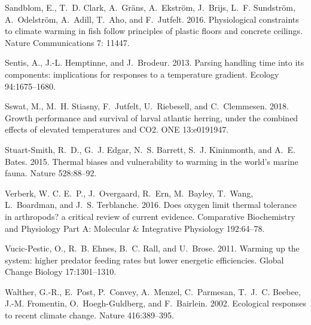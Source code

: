 \documentclass[11pt]{article}\usepackage[]{graphicx}\usepackage[]{color,soul}
\begin{document}
\begin{thebibliography}{55}
Sandblom, E., T.~D. Clark, A.~Gräns,  A.~Ekström, J.~Brijs, L.~F. Sundström, A.~Odelström, A.~Adill, T.~Aho, and F.~Jutfelt. 2016.
\newblock Physiological constraints to climate warming in fish follow principles of plastic floors and concrete ceilings. 
\newblock Nature Communications 7: 11447.


Sentis, A., J.-L. Hemptinne, and J.~Brodeur. 2013.
\newblock Parsing handling time into its components: implications for responses
  to a temperature gradient.
\newblock Ecology 94:1675--1680.

Sswat, M., M.~H. Stiasny, F.~Jutfelt, U.~Riebesell, and C.~Clemmesen.
  2018.
\newblock Growth performance and survival of larval atlantic herring, under the
  combined effects of elevated temperatures and {CO}2.
 {ONE} 13:e0191947.

Stuart-Smith, R.~D., G.~J. Edgar, N.~S. Barrett, S.~J. Kininmonth, and A.~E.
  Bates. 2015.
\newblock Thermal biases and vulnerability to warming in the world’s marine
  fauna.
\newblock Nature 528:88--92.

Verberk, W. C. E.~P., J.~Overgaard, R.~Ern, M.~Bayley, T.~Wang, L.~Boardman,
  and J.~S. Terblanche. 2016.
\newblock Does oxygen limit thermal tolerance in arthropods? a critical review
  of current evidence.
\newblock Comparative Biochemistry and Physiology Part A: Molecular \&
  Integrative Physiology 192:64--78.

Vucic-Pestic, O., R.~B. Ehnes, B.~C. Rall, and U.~Brose. 2011.
\newblock Warming up the system: higher predator feeding rates but lower
  energetic efficiencies.
\newblock Global Change Biology 17:1301--1310.

Walther, G.-R., E.~Post, P.~Convey, A.~Menzel, C.~Parmesan, T.~J.~C. Beebee,
  J.-M. Fromentin, O.~Hoegh-Guldberg, and F.~Bairlein. 2002.
\newblock Ecological responses to recent climate change.
\newblock Nature 416:389--395.

\end{thebibliography}
\end{document}
